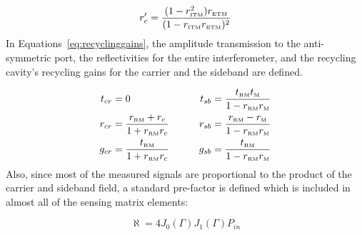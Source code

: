 \begin{equation}
r_c' = \frac{(1-r_{\mbox{\tiny ITM}}^2)r_{\mbox{\tiny ETM}}}
            {(1-r_{\mbox{\tiny ITM}}r_{\mbox{\tiny ETM}})^2}
\end{equation}
In Equations~\ref{eq:recyclinggains}, the amplitude transmission to the
anti-symmetric port, the reflectivities for the entire interferometer, and the
recycling cavity's recycling gains for the carrier and the sideband are defined.

\begin{alignat}{2}\label{eq:recyclinggains}
t_{cr} &= 0                  & \qquad     
t_{sb} &= \frac{t_{\mbox{\tiny RM}}t_{\mbox{\tiny M}}}{1-r_{\mbox{\tiny RM}}r_{\mbox{\tiny M}}} \\
r_{cr} &= \frac{r_{\mbox{\tiny RM}}+r_c}{1+r_{\mbox{\tiny RM}}r_c} & \qquad 
r_{sb} &= \frac{r_{\mbox{\tiny RM}}-r_{\mbox{\tiny M}}}{1-r_{\mbox{\tiny RM}}r_{\mbox{\tiny M}}} \notag \\
g_{cr} &= \frac{t_{\mbox{\tiny RM}}}{1+r_{\mbox{\tiny RM}}r_c}   & \qquad  
g_{sb} &= \frac{t_{\mbox{\tiny RM}}}{1-r_{\mbox{\tiny RM}}r_{\mbox{\tiny M}}} \notag
\end{alignat}
Also, since most of the measured signals are proportional to the product of the carrier
and sideband field, a standard pre-factor is defined which is included in almost all
of the sensing matrix elements:

\begin{equation}
  \aleph = 4 J_0(\Gamma) J_1(\Gamma) P_{in}
\end{equation}












